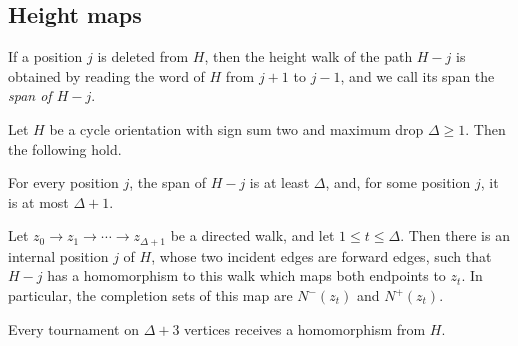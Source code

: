 \subsection{Height maps}
If a position $j$ is deleted from $H$, then the height walk of the path $H-j$ is obtained by reading the word of $H$ from $j+1$ to $j-1$, and we call its span the \emph{span of $H-j$}.

\begin{lemma}
\label{norm391:height}
Let $H$ be a cycle orientation with sign sum two and maximum drop $\Delta\ge1$. Then the following hold.
\begin{props}
\item\label{norm391:height:1} For every position $j$, the span of $H-j$ is at least $\Delta$, and, for some position $j$, it is at most $\Delta+1$.
\item\label{norm391:height:2} Let $z_0\to z_1\to\cdots\to z_{\Delta+1}$ be a directed walk, and let $1\le t\le\Delta$. Then there is an internal position $j$ of $H$, whose two incident edges are forward edges, such that $H-j$ has a homomorphism to this walk which maps both endpoints to $z_t$. In particular, the completion sets of this map are $N^-(z_t)$ and $N^+(z_t)$.
\item\label{norm391:height:3} Every tournament on $\Delta+3$ vertices receives a homomorphism from $H$.
\end{props}
\end{lemma}
